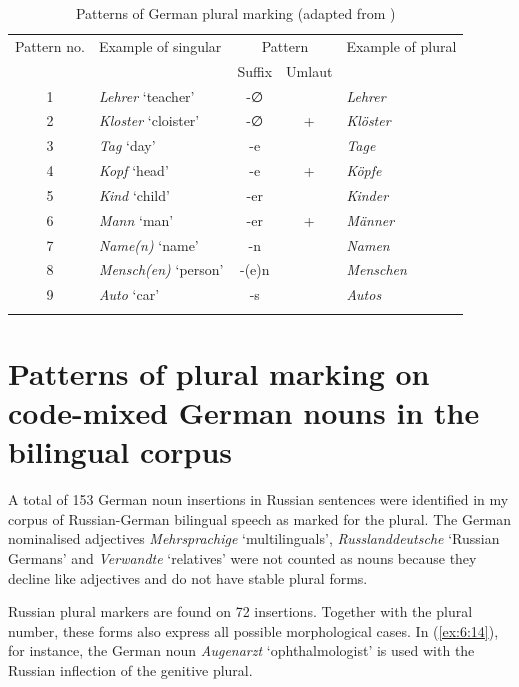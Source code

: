 \begin{table}
\begin{tabular}{c lccl}
 \lsptoprule
	Pattern no. & Example of singular & \multicolumn{2}{c}{Pattern} & Example of plural \\\cmidrule(lr){3-4}
	& & Suffix & Umlaut & \\\midrule
	1 & \textit{Lehrer} `teacher'	& -∅	& \textminus & \textit{Lehrer}\\
	2 & \textit{Kloster} `cloister' & -∅	& + & \textit{Klöster}\\
	3 & \textit{Tag} `day' & -e	& \textminus & \textit{Tage}\\
	4 & \textit{Kopf} `head' & -e	& + & \textit{Köpfe}\\
	5 & \textit{Kind} `child' & -er	& \textminus & \textit{Kinder}\\
	6 & \textit{Mann} `man' & -er	& + & \textit{Männer}\\
	7 & \textit{Name(n)} `name' & -n	& \textminus & \textit{Namen}\\
	8 & \textit{Mensch(en)} `person' & -(e)n	& \textminus & \textit{Menschen}\\
	9 & \textit{Auto} `car' & -s	& \textminus & \textit{Autos}\\
	\lspbottomrule
	\end{tabular}
	\caption{Patterns of German plural marking (adapted from \citealt[480]{flaemig})\label{tab:6:2}}
\end{table}

\section[Patterns of plural marking on code-mixed German nouns]
        {Patterns of plural marking on code-mixed German nouns in the bilingual corpus}\label{sec:patterns corpus}\largerpage

A total of 153 German noun insertions in Russian sentences were identified in my corpus of Russian-German bilingual speech as marked for the plural. The German nominalised adjectives \textit{Mehrsprachige} `multilinguals', \textit{Russlanddeutsche} `Russian Germans' and \textit{Verwandte} `relatives' were not counted as nouns because they decline like adjectives and do not have stable plural forms.

Russian plural markers are found on 72 insertions. Together with the plural number, these forms also express all possible morphological cases. In (\ref{ex:6:14}), for instance, the German noun \textit{Augenarzt} `ophthalmologist' is used with the Russian inflection of the genitive plural.

